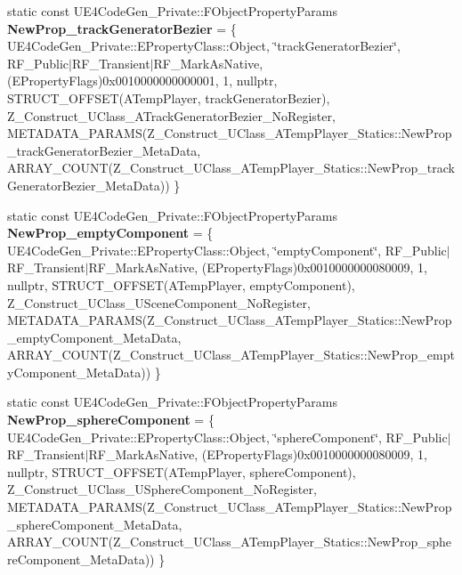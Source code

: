 \begin{DoxyCompactItemize}
static const U\+E4\+Code\+Gen\+\_\+\+Private\+::\+F\+Object\+Property\+Params {\bfseries New\+Prop\+\_\+track\+Generator\+Bezier} = \{ U\+E4\+Code\+Gen\+\_\+\+Private\+::\+E\+Property\+Class\+::\+Object, \char`\"{}track\+Generator\+Bezier\char`\"{}, R\+F\+\_\+\+Public$\vert$R\+F\+\_\+\+Transient$\vert$R\+F\+\_\+\+Mark\+As\+Native, (E\+Property\+Flags)0x0010000000000001, 1, nullptr, S\+T\+R\+U\+C\+T\+\_\+\+O\+F\+F\+S\+E\+T(\+A\+Temp\+Player, track\+Generator\+Bezier), Z\+\_\+\+Construct\+\_\+\+U\+Class\+\_\+\+A\+Track\+Generator\+Bezier\+\_\+\+No\+Register, M\+E\+T\+A\+D\+A\+T\+A\+\_\+\+P\+A\+R\+A\+M\+S(\+Z\+\_\+\+Construct\+\_\+\+U\+Class\+\_\+\+A\+Temp\+Player\+\_\+\+Statics\+::\+New\+Prop\+\_\+track\+Generator\+Bezier\+\_\+\+Meta\+Data, A\+R\+R\+A\+Y\+\_\+\+C\+O\+U\+N\+T(\+Z\+\_\+\+Construct\+\_\+\+U\+Class\+\_\+\+A\+Temp\+Player\+\_\+\+Statics\+::\+New\+Prop\+\_\+track\+Generator\+Bezier\+\_\+\+Meta\+Data)) \}
\item 
\mbox{\label{struct_z___construct___u_class___a_temp_player___statics_a3a97f5575dfa119563701074e7be18d5}} 
static const U\+E4\+Code\+Gen\+\_\+\+Private\+::\+F\+Object\+Property\+Params {\bfseries New\+Prop\+\_\+empty\+Component} = \{ U\+E4\+Code\+Gen\+\_\+\+Private\+::\+E\+Property\+Class\+::\+Object, \char`\"{}empty\+Component\char`\"{}, R\+F\+\_\+\+Public$\vert$R\+F\+\_\+\+Transient$\vert$R\+F\+\_\+\+Mark\+As\+Native, (E\+Property\+Flags)0x0010000000080009, 1, nullptr, S\+T\+R\+U\+C\+T\+\_\+\+O\+F\+F\+S\+E\+T(\+A\+Temp\+Player, empty\+Component), Z\+\_\+\+Construct\+\_\+\+U\+Class\+\_\+\+U\+Scene\+Component\+\_\+\+No\+Register, M\+E\+T\+A\+D\+A\+T\+A\+\_\+\+P\+A\+R\+A\+M\+S(\+Z\+\_\+\+Construct\+\_\+\+U\+Class\+\_\+\+A\+Temp\+Player\+\_\+\+Statics\+::\+New\+Prop\+\_\+empty\+Component\+\_\+\+Meta\+Data, A\+R\+R\+A\+Y\+\_\+\+C\+O\+U\+N\+T(\+Z\+\_\+\+Construct\+\_\+\+U\+Class\+\_\+\+A\+Temp\+Player\+\_\+\+Statics\+::\+New\+Prop\+\_\+empty\+Component\+\_\+\+Meta\+Data)) \}
\item 
\mbox{\label{struct_z___construct___u_class___a_temp_player___statics_a7c89d4bfd45b2b5250cbf5139353dd48}} 
static const U\+E4\+Code\+Gen\+\_\+\+Private\+::\+F\+Object\+Property\+Params {\bfseries New\+Prop\+\_\+sphere\+Component} = \{ U\+E4\+Code\+Gen\+\_\+\+Private\+::\+E\+Property\+Class\+::\+Object, \char`\"{}sphere\+Component\char`\"{}, R\+F\+\_\+\+Public$\vert$R\+F\+\_\+\+Transient$\vert$R\+F\+\_\+\+Mark\+As\+Native, (E\+Property\+Flags)0x0010000000080009, 1, nullptr, S\+T\+R\+U\+C\+T\+\_\+\+O\+F\+F\+S\+E\+T(\+A\+Temp\+Player, sphere\+Component), Z\+\_\+\+Construct\+\_\+\+U\+Class\+\_\+\+U\+Sphere\+Component\+\_\+\+No\+Register, M\+E\+T\+A\+D\+A\+T\+A\+\_\+\+P\+A\+R\+A\+M\+S(\+Z\+\_\+\+Construct\+\_\+\+U\+Class\+\_\+\+A\+Temp\+Player\+\_\+\+Statics\+::\+New\+Prop\+\_\+sphere\+Component\+\_\+\+Meta\+Data, A\+R\+R\+A\+Y\+\_\+\+C\+O\+U\+N\+T(\+Z\+\_\+\+Construct\+\_\+\+U\+Class\+\_\+\+A\+Temp\+Player\+\_\+\+Statics\+::\+New\+Prop\+\_\+sphere\+Component\+\_\+\+Meta\+Data)) \}

\end{DoxyCompactItemize}
